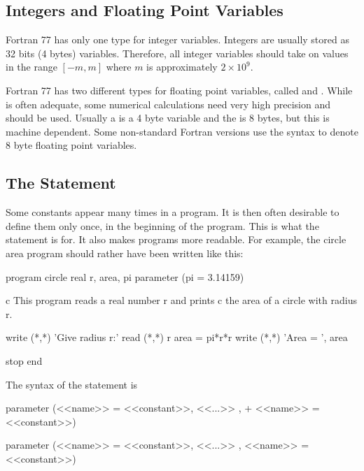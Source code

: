 \subsection*{Integers and Floating Point Variables}

Fortran 77 has only one type for integer variables. Integers are usually
stored as 32 bits (4 bytes) variables. Therefore, all integer variables
should take on values in the range \( [-m,m] \) where \( m \) is
approximately \(2 \times 10^9 \).

Fortran 77 has two different types for floating point variables, called
 and . While
 is often adequate, some numerical calculations
need very high precision and \\
 should be used. Usually a
 is a 4 byte variable and the
 is 8 bytes, but this is machine
dependent. Some non-standard Fortran versions use the syntax
 to denote 8 byte floating point variables.


\subsection*{The  Statement}

Some constants appear many times in a program. It is then often
desirable to define them only once, in the beginning of the program.
This is what the  statement is for. It also
makes programs more readable. For example, the circle area program
should rather have been written like this:

\begin{fortran77}
      program circle
      real r, area, pi
      parameter (pi = 3.14159)
 
c This program reads a real number r and prints
c the area of a circle with radius r.
 
      write (*,*) 'Give radius r:'
      read  (*,*) r
      area = pi*r*r
      write (*,*) 'Area = ', area
 
      stop
      end
\end{fortran77}

The syntax of the  statement is

\ifdefined\mini
\begin{fortran77}
      parameter (<<name>> = <<constant>>, <<...>> ,
     +           <<name>> = <<constant>>)
\end{fortran77}
\else
\begin{fortran77}
      parameter (<<name>> = <<constant>>, <<...>> , <<name>> = <<constant>>)
\end{fortran77}
\fi

